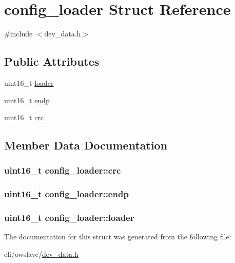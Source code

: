 \hypertarget{structconfig__loader}{\section{config\-\_\-loader Struct Reference}
\label{structconfig__loader}
}


{\ttfamily \#include $<$dev\-\_\-data.\-h$>$}

\subsection*{Public Attributes}
\begin{DoxyCompactItemize}
\item 
uint16\-\_\-t \hyperlink{structconfig__loader_af965038b455ac61d82f074b422e04d81}{loader}
\item 
uint16\-\_\-t \hyperlink{structconfig__loader_a2061ae71465754796a2fb37c0aca18a6}{endp}
\item 
uint16\-\_\-t \hyperlink{structconfig__loader_a02a14b09e5390cc08f2727f2a6b270b6}{crc}
\end{DoxyCompactItemize}


\subsection{Member Data Documentation}
\hypertarget{structconfig__loader_a02a14b09e5390cc08f2727f2a6b270b6}{
\subsubsection[{crc}]{\setlength{\rightskip}{0pt plus 5cm}uint16\-\_\-t config\-\_\-loader\-::crc}}\label{structconfig__loader_a02a14b09e5390cc08f2727f2a6b270b6}
\hypertarget{structconfig__loader_a2061ae71465754796a2fb37c0aca18a6}{
\subsubsection[{endp}]{\setlength{\rightskip}{0pt plus 5cm}uint16\-\_\-t config\-\_\-loader\-::endp}}\label{structconfig__loader_a2061ae71465754796a2fb37c0aca18a6}
\hypertarget{structconfig__loader_af965038b455ac61d82f074b422e04d81}{
\subsubsection[{loader}]{\setlength{\rightskip}{0pt plus 5cm}uint16\-\_\-t config\-\_\-loader\-::loader}}\label{structconfig__loader_af965038b455ac61d82f074b422e04d81}


The documentation for this struct was generated from the following file\-:\begin{DoxyCompactItemize}
\item 
cli/owslave/\hyperlink{dev__data_8h}{dev\-\_\-data.\-h}\end{DoxyCompactItemize}

